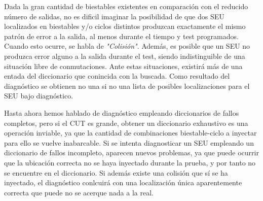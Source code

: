 Dada la gran cantidad de biestables existentes en comparación con el reducido
número de salidas, no es dificil imaginar la posibilidad de que dos \gls{SEU}
localizados en biestables y/o ciclos distintos produzcan exactamente el mismo
patrón de error a la salida, al menos durante el tiempo y test programados. 
Cuando esto ocurre, se habla de \textit{"Colisión"}. Además, es posible que un
\gls{SEU} no produzca error alguno a la salida durante el test, siendo
indistinguible de una situación libre de conmutaciones. Ante estas situaciones,
existirá más de una entada del diccionario que conincida con la buscada. Como
resultado del diagnóstico se obtienen no una si no una lista de posibles
localizaciones para el \gls{SEU} bajo diagnóstico.

Hasta ahora hemos hablado de diagnóstico empleando diccionarios de fallos
completos, pero si el \gls{CUT} es grande, obtener un diccionario exhaustivo es
una operación inviable, ya que la cantidad de combinaciones biestable-ciclo a
inyectar para ello se vuelve inabarcable. Si se intenta diagnosticar un \gls{SEU}
empleando un diccionario de fallos incompleto, aparecen nuevos problemas, ya que
puede ocurrir que la ubicación correcta no se haya inyectado durante la prueba, y
por tanto no se encuentre en el diccionario. Si además existe una colisión que sí
se ha inyectado, el diagnóstico conlcuirá con una localización única
aparentemente correcta que puede no se acerque nada a la real.


\endinput
